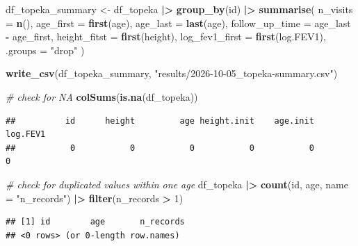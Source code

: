 \documentclass[
]{article}
\newenvironment{Shaded}{\begin{snugshade}}{\end{snugshade}}
\newcommand{\AttributeTok}[1]{\textcolor[rgb]{0.13,0.29,0.53}{#1}}
\newcommand{\CommentTok}[1]{\textcolor[rgb]{0.56,0.35,0.01}{\textit{#1}}}
\newcommand{\DecValTok}[1]{\textcolor[rgb]{0.00,0.00,0.81}{#1}}
\newcommand{\FunctionTok}[1]{\textcolor[rgb]{0.13,0.29,0.53}{\textbf{#1}}}
\newcommand{\NormalTok}[1]{#1}
\newcommand{\OtherTok}[1]{\textcolor[rgb]{0.56,0.35,0.01}{#1}}
\newcommand{\SpecialCharTok}[1]{\textcolor[rgb]{0.81,0.36,0.00}{\textbf{#1}}}
\newcommand{\StringTok}[1]{\textcolor[rgb]{0.31,0.60,0.02}{#1}}
\begin{document}
\begin{Shaded}
\begin{Highlighting}[]
\NormalTok{df\_topeka\_summary }\OtherTok{\textless{}{-}}\NormalTok{ df\_topeka }\SpecialCharTok{|\textgreater{}}
  \FunctionTok{group\_by}\NormalTok{(id) }\SpecialCharTok{|\textgreater{}}
  \FunctionTok{summarise}\NormalTok{(}
    \AttributeTok{n\_visits =} \FunctionTok{n}\NormalTok{(),}
    \AttributeTok{age\_first =} \FunctionTok{first}\NormalTok{(age),}
    \AttributeTok{age\_last =} \FunctionTok{last}\NormalTok{(age),}
    \AttributeTok{follow\_up\_time =}\NormalTok{ age\_last }\SpecialCharTok{{-}}\NormalTok{ age\_first,}
    \AttributeTok{height\_fitst =} \FunctionTok{first}\NormalTok{(height),}
    \AttributeTok{log\_fev1\_first =} \FunctionTok{first}\NormalTok{(log.FEV1),}
    \AttributeTok{.groups =} \StringTok{"drop"}
\NormalTok{  )}

\FunctionTok{write\_csv}\NormalTok{(df\_topeka\_summary, }\StringTok{"results/2026{-}10{-}05\_topeka{-}summary.csv"}\NormalTok{)}
\end{Highlighting}
\end{Shaded}

\begin{Shaded}
\begin{Highlighting}[]
\CommentTok{\# check for NA}
\FunctionTok{colSums}\NormalTok{(}\FunctionTok{is.na}\NormalTok{(df\_topeka))}
\end{Highlighting}
\end{Shaded}

\begin{verbatim}
##          id      height         age height.init    age.init    log.FEV1 
##           0           0           0           0           0           0
\end{verbatim}

\begin{Shaded}
\begin{Highlighting}[]
\CommentTok{\# check for duplicated values within one age}
\NormalTok{df\_topeka }\SpecialCharTok{|\textgreater{}}
  \FunctionTok{count}\NormalTok{(id, age, }\AttributeTok{name =} \StringTok{"n\_records"}\NormalTok{) }\SpecialCharTok{|\textgreater{}}
  \FunctionTok{filter}\NormalTok{(n\_records }\SpecialCharTok{\textgreater{}} \DecValTok{1}\NormalTok{)}
\end{Highlighting}
\end{Shaded}

\begin{verbatim}
## [1] id        age       n_records
## <0 rows> (or 0-length row.names)
\end{verbatim}
\end{document}
